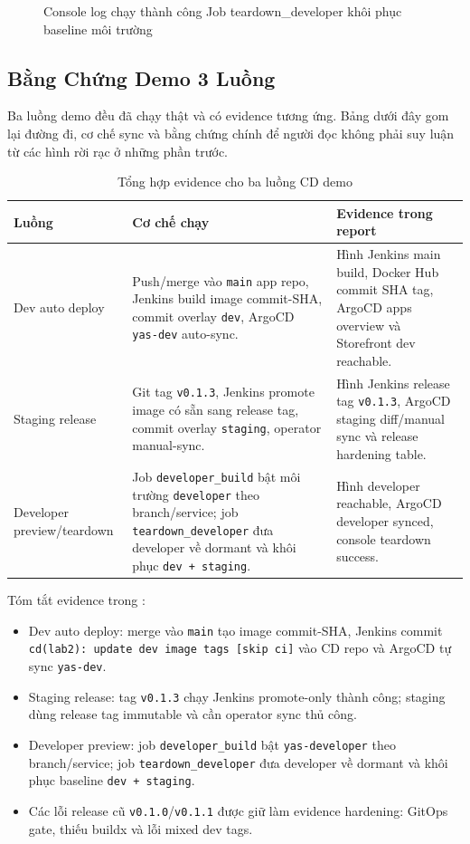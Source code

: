 \begin{figure}[H]
\centering
{}
\caption{Console log chạy thành công Job teardown\_developer khôi phục baseline môi trường}
\end{figure}

\subsection{Bằng Chứng Demo 3 Luồng}

Ba luồng demo đều đã chạy thật và có evidence tương ứng. Bảng dưới đây gom lại
đường đi, cơ chế sync và bằng chứng chính để người đọc không phải suy luận từ
các hình rời rạc ở những phần trước.

\begin{table}[H]
\centering
\caption{Tổng hợp evidence cho ba luồng CD demo}
\begin{tabular}{|p{2.8cm}|p{5.2cm}|p{5.8cm}|}
\hline
\textbf{Luồng} & \textbf{Cơ chế chạy} & \textbf{Evidence trong report} \\
\hline
Dev auto deploy & Push/merge vào \texttt{main} app repo, Jenkins build image commit-SHA, commit overlay \texttt{dev}, ArgoCD \texttt{yas-dev} auto-sync. & Hình Jenkins main build, Docker Hub commit SHA tag, ArgoCD apps overview và Storefront dev reachable. \\
\hline
Staging release & Git tag \texttt{v0.1.3}, Jenkins promote image có sẵn sang release tag, commit overlay \texttt{staging}, operator manual-sync. & Hình Jenkins release tag \texttt{v0.1.3}, ArgoCD staging diff/manual sync và release hardening table. \\
\hline
Developer preview/teardown & Job \texttt{developer\_build} bật môi trường \texttt{developer} theo branch/service; job \texttt{teardown\_developer} đưa developer về dormant và khôi phục \texttt{dev + staging}. & Hình developer reachable, ArgoCD developer synced, console teardown success. \\
\hline
\end{tabular}
\end{table}

Tóm tắt evidence trong :

\begin{itemize}
    \item Dev auto deploy: merge vào \texttt{main} tạo image commit-SHA, Jenkins commit \texttt{cd(lab2): update dev image tags [skip ci]} vào CD repo và ArgoCD tự sync \texttt{yas-dev}.
    \item Staging release: tag \texttt{v0.1.3} chạy Jenkins promote-only thành công; staging dùng release tag immutable và cần operator sync thủ công.
    \item Developer preview: job \texttt{developer\_build} bật \texttt{yas-developer} theo branch/service; job \texttt{teardown\_developer} đưa developer về dormant và khôi phục baseline \texttt{dev + staging}.
    \item Các lỗi release cũ \texttt{v0.1.0}/\texttt{v0.1.1} được giữ làm evidence hardening: GitOps gate, thiếu buildx và lỗi mixed dev tags.
\end{itemize}

